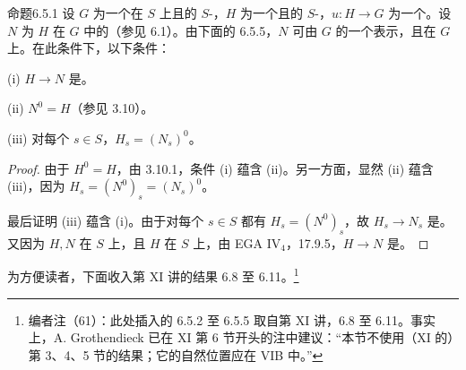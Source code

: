 \begin{SGAresult}{命题}{6.5.1}
设 $G$ 为一个在 $S$ 上且的 $S$-，$H$ 为一个且的 $S$-，$u:H\to G$ 为一个。设 $N$ 为 $H$ 在 $G$ 中的（参见 6.1）。由下面的 6.5.5，$N$ 可由 $G$ 的一个表示，且在 $G$ 上。在此条件下，以下条件：

(i)  $H\to N$ 是。

(ii) $N^0=H$（参见 3.10）。

(iii) 对每个 $s\in S$，$H_s=(N_s)^0$。
\end{SGAresult}
\begin{proof}
由于 $H^0=H$，由 3.10.1，条件 (i) 蕴含 (ii)。另一方面，显然 (ii) 蕴含 (iii)，因为 $H_s=(N^0)_s=(N_s)^0$。

最后证明 (iii) 蕴含 (i)。由于对每个 $s\in S$ 都有 $H_s=(N^0)_s$，故 $H_s\to N_s$ 是。又因为 $H,N$ 在 $S$ 上，且 $H$ 在 $S$ 上，由 EGA $\mathrm{IV}_4$，17.9.5，$H\to N$ 是。
\end{proof}
为方便读者，下面收入第 XI 讲的结果 6.8 至 6.11。\footnote{编者注（61）：此处插入的 6.5.2 至 6.5.5 取自第 XI 讲，6.8 至 6.11。事实上，A. Grothendieck 已在 XI 第 6 节开头的注中建议：“本节不使用（XI 的）第 3、4、5 节的结果；它的自然位置应在 VIB 中。”}


